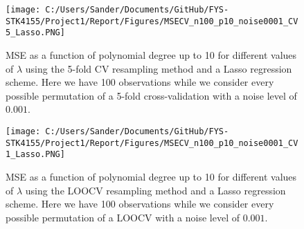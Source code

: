 \documentclass[12pt,a4paper]{article}
\begin{document}
\begin{figure}[H]
\centering
\texttt{[image: C:/Users/Sander/Documents/GitHub/FYS-STK4155/Project1/Report/Figures/MSECV\_n100\_p10\_noise0001\_CV5\_Lasso.PNG]}
\caption{\label{fig:MSELasso3} MSE as a function of polynomial degree up to 10 for different values of $\lambda$ using the 5-fold CV resampling method and a Lasso regression scheme. Here we have 100 observations while we consider every possible permutation of a 5-fold cross-validation with a noise level of $0.001$.}
\end{figure}

\begin{figure}[H]
\centering
\texttt{[image: C:/Users/Sander/Documents/GitHub/FYS-STK4155/Project1/Report/Figures/MSECV\_n100\_p10\_noise0001\_CV1\_Lasso.PNG]}
\caption{\label{fig:MSELasso4} MSE as a function of polynomial degree up to 10 for different values of $\lambda$ using the LOOCV resampling method and a Lasso regression scheme. Here we have 100 observations while we consider every possible permutation of a LOOCV with a noise level of $0.001$.}
\end{figure}
\end{document}
